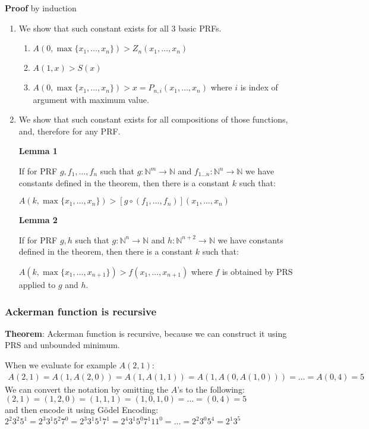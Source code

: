 \documentclass{article}
\begin{document}
\textbf{Proof} by induction
\begin{enumerate}
  \item We show that such constant exists for all 3 basic PRFs.
  \begin{enumerate}
    \item $A(0,\max\{x_1,\ldots,x_n\}) > Z_n(x_1,\ldots,x_n)$
    \item $A(1,x) > S(x)$
    \item $A(0,\max\{x_1,\ldots,x_n\}) > x = P_{n,i}(x_1,\ldots,x_n)$ where $i$ is index 
    of argument with maximum value.
   \end{enumerate}
  \item We show that such constant exists for all compositions of those functions, and, therefore 
  for any PRF.
  
  \textbf{Lemma 1}
  
  If for PRF $g,f_1,\ldots,f_n$ such that $g: \mathbb{N}^m \rightarrow \mathbb{N}$ and 
  $f_{1 \ldots n}: \mathbb{N}^n\rightarrow \mathbb{N}$ we have constants defined in the theorem, 
  then there is a constant $k$ such that:
  
  $A(k,\max\{x_1,\ldots,x_n\}) > [g \circ (f_1,\ldots,f_n)](x_1,\ldots,x_n)$ 
  
  \textbf{Lemma 2} 
  
  If for PRF $g,h$ such that $g: \mathbb{N}^n \rightarrow \mathbb{N}$ and 
  $h: \mathbb{N}^{n+2} \rightarrow \mathbb{N}$ we have constants defined in the theorem,
  then there is a constant $k$ such that:
  
  $A(k,\max\{x_1,\ldots,x_{n+1}\}) > f(x_1,\ldots,x_{n+1})$ where $f$ is obtained by PRS applied to
  $g$ and $h$.
\end{enumerate}

\subsubsection{Ackerman function is recursive}
\textbf{Theorem}: Ackerman function is recursive, because we can construct it using PRS and
unbounded minimum.

When we evaluate for example $A(2,1)$:
\begin{gather*}
A(2,1) = A(1,A(2,0)) = A(1,A(1,1)) = A(1,A(0,A(1,0))) = \ldots = A(0,4) = 5
\end{gather*}
We can convert the notation by omitting the $A$'s to the following:
$(2,1) = (1,2,0) = (1,1,1) = (1,0,1,0) = \ldots = (0,4) = 5$ \\
and then encode it using Gödel Encoding: $2^2 3^2 5^1 = 2^3 3^1 5^2 7^0 = 2^3 3^1 5^1 7^1 
= 2^4 3^1 5^0 7^1 11^0 = \ldots = 2^2 3^0 5^4 = 2^1 3^5$
\end{document}
